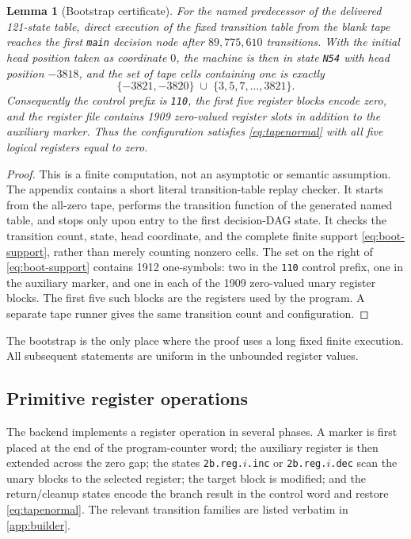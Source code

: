 \documentclass[10pt]{article}
\newtheorem{lemma}[theorem]{Lemma}
\theoremstyle{definition}
\begin{document}
\begin{lemma}[Bootstrap certificate]
\label{lem:bootstrap}
For the named predecessor of the delivered 121-state table, direct execution
of the fixed transition table from the blank tape reaches the first
\texttt{main} decision node after $89{,}775{,}610$ transitions.  With the
initial head position taken as coordinate $0$, the machine is then in state
\texttt{N54} with head position $-3818$, and the set of tape cells containing
one is exactly
\begin{equation}
\label{eq:boot-support}
\{-3821,-3820\}\;\cup\;\{3,5,7,\ldots,3821\}.
\end{equation}
Consequently the control prefix is \texttt{110}, the first five register
blocks encode zero, and the register file contains 1909 zero-valued register
slots in addition to the auxiliary marker.  Thus the configuration satisfies
\eqref{eq:tapenormal} with all five logical registers equal to zero.
\end{lemma}

\begin{proof}
This is a finite computation, not an asymptotic or semantic assumption.  The
appendix contains a short literal transition-table replay checker.  It starts
from the all-zero tape, performs the transition function of the generated
named table, and stops only upon entry to the first decision-DAG state.  It
checks the transition count, state, head coordinate, and the complete finite
support \eqref{eq:boot-support}, rather than merely counting nonzero cells.
The set on the right of \eqref{eq:boot-support} contains 1912 one-symbols:
two in the \texttt{110} control prefix, one in the auxiliary marker, and one
in each of the 1909 zero-valued unary register blocks.  The first five such
blocks are the registers used by the program.  A separate tape runner gives
the same transition count and configuration.
\end{proof}

The bootstrap is the only place where the proof uses a long fixed finite
execution.  All subsequent statements are uniform in the unbounded register
values.

\subsection{Primitive register operations}

The backend implements a register operation in several phases.  A marker is
first placed at the end of the program-counter word; the auxiliary register is
then extended across the zero gap; the states
\texttt{2b.reg.$i$.inc} or \texttt{2b.reg.$i$.dec} scan the unary blocks to the
selected register; the target block is modified; and the return/cleanup
states encode the branch result in the control word and restore
\eqref{eq:tapenormal}.  The relevant transition families are listed verbatim
in \cref{app:builder}.
\end{document}
